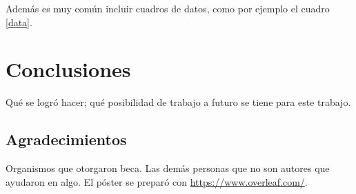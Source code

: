 \documentclass{sciposter}
\begin{document}
\begin{multicols}{2}
Además es muy común incluir cuadros de datos, como por ejemplo el cuadro \ref{data}.

\begin{table}
\setcounter{table}{0} %
\captionsetup{type=table} %
\caption{Aquí explicas cómo interpreta el cuadro.}
\label{data}
\begin{center}
\end{center}
\end{table}

\section{Conclusiones}

Qué se logró hacer; qué posibilidad de trabajo a futuro se tiene para este trabajo.

\subsection*{Agradecimientos}

Organismos que otorgaron beca. Las demás personas que no son autores que ayudaron en algo. El póster se preparó con \url{https://www.overleaf.com/}.

\end{multicols}



\end{document}
